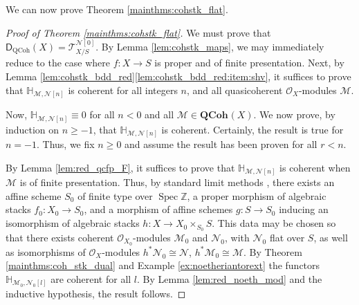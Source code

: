 \documentclass{amsart}
\theoremstyle{plain}
\theoremstyle{definition}
\theoremstyle{remark}
\numberwithin{equation}{section}
\newcommand{\itemref}[1]{\eqref{#1}}
\newcommand{\Z}{\mathbb{Z}}
\newcommand{\Orb}{\mathcal{O}}
\DeclareMathOperator{\spec}{Spec}
\newcommand{\QCOHB}{\mathbf{QCoh}}
\newcommand{\QCOH}[2][]{\QCOHB^{#1}({#2})}
\newcommand{\DCAT}{\mathsf{D}}
\newcommand{\shv}[1]{\mathcal{{#1}}}
\newcommand{\E}[2]{\mathbb{H}_{{#1},{#2}}}
\newcommand{\DQCOH}{\DCAT_{\mathrm{QCoh}}}
\newcommand{\TSUB}[2]{\mathcal{T}_{{#1}}^{{#2}}}
\begin{document}
We can now prove Theorem
\ref{mainthms:cohstk_flat}.
\begin{proof}[Proof of Theorem
  \ref{mainthms:cohstk_flat}]
  We must prove that
  $\DQCOH(X)=\TSUB{X/S}{\shv{N}[0]}$. By Lemma \ref{lem:cohstk_maps},
  we may immediately reduce to the case where $f : X \to S$ is proper and of
  finite presentation. Next, by Lemma
  \ref{lem:cohstk_bdd_red}\itemref{lem:cohstk_bdd_red:item:shv}, it 
  suffices to prove that $\E{\shv{M}}{\shv{N}[n]}$ is coherent
  for all integers $n$, and all quasicoherent $\Orb_X$-modules
  $\shv{M}$.

  Now, $\E{\shv{M}}{\shv{N}[n]} \equiv 0$ for all $n<0$ and all
  $\shv{M} \in \QCOH{X}$. We now prove, by induction on $n\geq -1$,
  that $\E{\shv{M}}{\shv{N}[n]}$ is coherent. Certainly, the result
  is true for $n=-1$. Thus, we fix $n\geq 0$ and assume the result
  has been proven for all $r<n$. 

  By Lemma \ref{lem:red_qcfp_F}, it suffices to prove that
  $\E{\shv{M}}{\shv{N}[n]}$ is coherent when $\shv{M}$ is of finite
  presentation. Thus, by standard limit methods
  \cite[Prop.~B.3]{rydh-2009}, there exists an affine scheme $S_0$ of
  finite type over $\spec \Z$, a proper morphism of algebraic stacks
  $f_0 : X_0 \to S_0$, and a morphism of affine schemes $g : S \to
  S_0$ inducing an isomorphism of algebraic stacks $h : X \to X_0
  \times_{S_0} S$. This data may be chosen so that there exists
  coherent $\Orb_{X_0}$-modules $\shv{M}_0$ and $\shv{N}_0$, with
  $\shv{N}_0$ flat over $S$, as well as isomorphisms of
  $\Orb_X$-modules $h^*\shv{N}_0 \cong \shv{N}$, $h^*\shv{M}_0 \cong
  \shv{M}$. By Theorem \ref{mainthms:coh_stk_dual} and Example
  \ref{ex:noetheriantorext} the functors $\E{\shv{M}_0}{\shv{N}_0[l]}$
  are coherent for all $l$. By Lemma \ref{lem:red_noeth_mod} and the
  inductive hypothesis, the result follows. 
  \end{proof}
\end{document}
